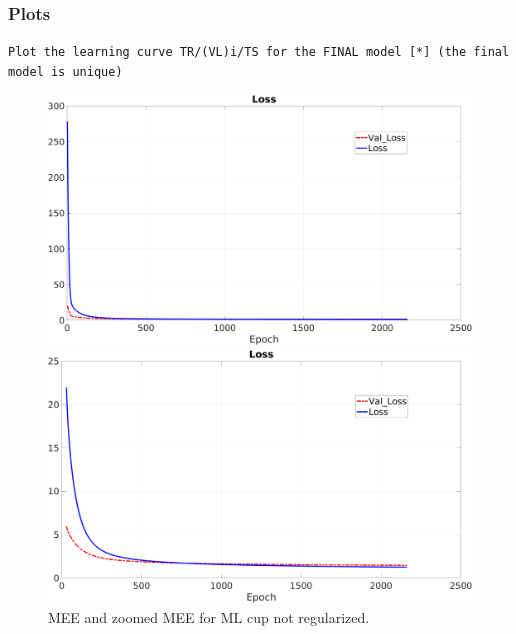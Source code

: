 \subsubsection{Plots}
\texttt{Plot the learning curve TR/(VL)i/TS for the FINAL model [*] (the final model is unique) }
\begin{figure}[H]
    \centering
    \begin{minipage}[t]{0.5\linewidth}
        \includegraphics[width=\linewidth]{img/Cup_loss_noReg_noZoom.png}
    \end{minipage}%
    \begin{minipage}[t]{0.5\linewidth}
        \includegraphics[width=\linewidth]{img/Cup_loss_noReg_zoom.png}
    \end{minipage}
    \caption{MEE and zoomed MEE for ML cup not regularized.}
\end{figure}

